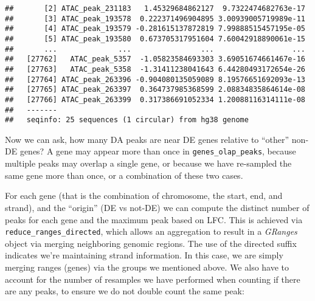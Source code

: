 \documentclass[
]{article}
\newenvironment{Shaded}{}{}
\newcommand{\DataTypeTok}[1]{\textcolor[rgb]{0.56,0.13,0.00}{#1}}
\newcommand{\KeywordTok}[1]{\textcolor[rgb]{0.00,0.44,0.13}{\textbf{#1}}}
\newcommand{\NormalTok}[1]{#1}
\newcommand{\OperatorTok}[1]{\textcolor[rgb]{0.40,0.40,0.40}{#1}}
\newcommand{\StringTok}[1]{\textcolor[rgb]{0.25,0.44,0.63}{#1}}
\begin{document}
\begin{verbatim}
##       [2] ATAC_peak_231183   1.45329684862127  9.7322474682763e-17
##       [3] ATAC_peak_193578  0.222371496904895 3.00939005719989e-11
##       [4] ATAC_peak_193579 -0.281615137872819 7.99888515457195e-05
##       [5] ATAC_peak_193580  0.673705317951604 7.60042918890061e-15
##       ...              ...                ...                  ...
##   [27762]   ATAC_peak_5357  -1.05823584693303 3.69051674661467e-16
##   [27763]   ATAC_peak_5358  -1.31411238041643 6.44280493172654e-26
##   [27764] ATAC_peak_263396 -0.904080135059089 8.19576651692093e-13
##   [27765] ATAC_peak_263397  0.364737985368599 2.08834835864614e-08
##   [27766] ATAC_peak_263399  0.317386691052334 1.20088116314111e-08
##   -------
##   seqinfo: 25 sequences (1 circular) from hg38 genome
\end{verbatim}

Now we can ask, how many DA peaks are near DE genes relative to ``other'' non-DE
genes? A gene may appear more than once in \texttt{genes\_olap\_peaks}, because
multiple peaks may overlap a single gene, or because we have re-sampled the
same gene more than once, or a combination of these two cases.

For each gene (that is the combination of chromosome, the start, end, and
strand), and the ``origin'' (DE vs not-DE) we can compute the distinct number of
peaks for each gene and the maximum peak based on LFC. This is achieved via
\texttt{reduce\_ranges\_directed}, which allows an aggregation to result in a \emph{GRanges}
object via merging neighboring genomic regions. The use of the directed suffix
indicates we're maintaining strand information. In this case, we are simply
merging ranges (genes) via the groups we mentioned above. We also have to
account for the number of resamples we have performed when counting if there
are any peaks, to ensure we do not double count the same peak:

\begin{Shaded}
\end{Shaded}
\end{document}
